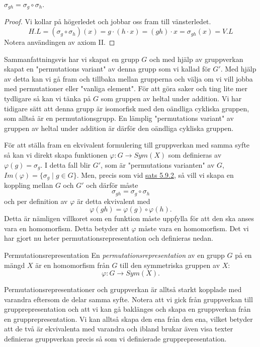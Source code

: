 \documentclass{article}
\theoremstyle{definition}
\begin{document}
\hypertarget{sats.4.9.2}{}
\begin{mytheo}{}{}
  $\sigma_{gh} = \sigma_g \circ \sigma_h$.
\end{mytheo}
\begin{proof}
  Vi kollar på högerledet och jobbar oss fram till vänsterledet.
  \[H.L = (\sigma_g \circ \sigma_h)(x) = g \cdot (h \cdot x) = (gh) \cdot x = \sigma_{gh}(x) = V.L\]
  Notera användingen av axiom II.
\end{proof}

Sammanfattningsvis har vi skapat en grupp $G$ och med hjälp av gruppverkan 
skapat en "permutations variant" av denna grupp som vi kallad för $G'$. Med hjälp av 
detta kan vi gå fram och tillbaka mellan grupperna och välja om vi vill jobba 
med permutationer eller "vanliga element". För att göra saker och ting lite mer tydligare 
så kan vi tänka på $G$ som gruppen av heltal under addition. Vi har tidigare sätt 
att denna grupp är isomorfisk med den oändliga cykliska gruppen, som alltså är en 
permutationsgrupp. En lämplig "permutations variant" av gruppen av heltal under addition 
är därför den oändliga cykliska gruppen. 

För att ställa fram en ekvivalent formulering till gruppverkan med samma syfte 
så kan vi direkt skapa funktionen
$\varphi: G \rightarrow Sym(X)$
som definieras av $\varphi(g) = \sigma_g$.
I detta fall blir $G'$, som är "permutations varianten" av $G$, $Im(\varphi) = 
\{\sigma_g \; | \; g \in G\}$. Men, precis som vid \hyperlink{sats.4.9.2}{sats 5.9.2}, så 
vill vi skapa en koppling mellan $G$ och $G'$ och därför måste 
\[\sigma_{gh} = \sigma_g \circ \sigma_h\]
och per definition av $\varphi$ är detta ekvivalent med 
\[\varphi(gh) = \varphi(g) \circ \varphi(h).\]
Detta är nämligen villkoret som 
en funktion måste uppfylla för att den ska anses vara en homomorfism. Detta betyder att 
$\varphi$ måste vara en homomorfism. Det vi har gjort nu heter 
permutationsrepresentation och definieras nedan.

\begin{mydef}{Permutationsrepresentation}{}
  En \textit{permutationsrepresentation} av en grupp $G$ på en mängd $X$ 
  är en homomorfism från $G$ till den symmetriska gruppen av $X$:
  \[\varphi: G \rightarrow Sym(X).\]
\end{mydef}

Permutationsrepresentationer och gruppverkan är alltså starkt kopplade med varandra 
eftersom de delar samma syfte. Notera att vi gick från gruppverkan till grupprepresentation
och att vi kan gå baklänges och skapa en gruppverkan från en grupprepresentation. 
Vi kan alltså skapa den ena från den ena, vilket betyder att de två är ekvivalenta med varandra
och ibland brukar även visa texter definieras gruppverkan precis så som vi definierade 
grupprepresentation.
\end{document}

